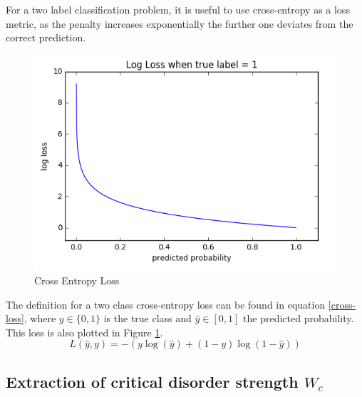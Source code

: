 \documentclass[reprint,amsmath,amssymb,aps,prb]{revtex4-2}
\begin{document}
For a two label classification problem, it is useful to use cross-entropy as a loss metric, as the penalty increases exponentially the further one deviates from the correct prediction.\cite{Goodfellow-et-al-2016}
\begin{figure}[h!]
\centering
\includegraphics[width=\linewidth]{figures/cross_entropy}
\caption{Cross Entropy Loss}
\label{fig:cross_entropy}
\end{figure}
The definition for a two class cross-entropy loss can be found in equation \ref{cross-loss}, where $y \in \{0,1\}$ is the true class and $\hat{y}\in\left[0,1\right]$ the predicted probability. This loss is also plotted in Figure \ref{fig:cross_entropy}.
\begin{equation}
L(\hat{y}, y)=-\left(y\log(\hat{y})+(1-y)\log(1-\hat{y})\right)\label{cross-loss}
\end{equation}

\subsection{Extraction of critical disorder strength $W_c$}
\end{document}
